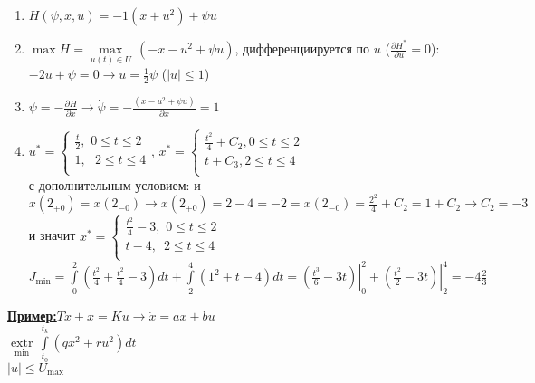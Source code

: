 \documentclass[preprint,russian,a5paper,10pt,twoside,mediummath]{ncc}
\newcommand{\ExampleMy}{\textbf{\underline{Пример:}}}
\begin{document}
\begin{enumerate}
\item $H\left( \psi ,x,u \right)=-1\left( x+{{u}^{2}} \right)+\psi u$
\item $\max H=\underset{u\left( t \right)\in U}{\mathop{\max }}\,\left( -x-{{u}^{2}}+\psi u \right)$, дифференциируется по $u$ ($\frac{\partial {{H}^{*}}}{\partial u}=0$):$-2u+\psi =0\to u=\frac{1}{2}\psi $ ($\left| u \right|\le 1$)
\item $\psi =-\frac{\partial H}{\partial x}\to \dot{\psi }=-\frac{\left( x-{{u}^{2}}+\psi u \right)}{\partial x}=1$
\item ${{u}^{*}}=\left\{ \begin{array}{*{35}{l}}
   \frac{t}{2},\,\,0\le t\le 2  \\
   1,\,\,\,\,2\le t\le 4  \\
\end{array} \right.$, ${{x}^{*}}=\left\{ \begin{array}{*{35}{l}}
   \frac{{{t}^{2}}}{4}+{{C}_{2}},0\le t\le 2  \\
   t+{{C}_{3}},2\le t\le 4  \\
\end{array} \right.$
\\с дополнительным условием: 
и $x\left( {{2}_{+0}} \right)=x\left( {{2}_{-0}} \right)\to x\left( {{2}_{+0}} \right)=2-4=-2=x\left( {{2}_{-0}} \right)=\frac{{{2}^{2}}}{4}+{{C}_{2}}=1+{{C}_{2}}\to {{C}_{2}}=-3$ и значит ${{x}^{*}}=\left\{ \begin{array}{*{35}{l}}
   \frac{{{t}^{2}}}{4}-3,\,\,0\le t\le 2  \\
   t-4,\,\,\,2\le t\le 4  \\
\end{array} \right.$
\\${{J}_{\min }}=\int\limits_{0}^{2}{\left( \frac{{{t}^{2}}}{4}+\frac{{{t}^{2}}}{4}-3 \right)}dt+\int\limits_{2}^{4}{\left( {{1}^{2}}+t-4 \right)}dt=\left. \left( \frac{{{t}^{3}}}{6}-3t \right) \right|_{0}^{2}+\left. \left( \frac{{{t}^{2}}}{2}-3t \right) \right|_{2}^{4}=-4\frac{2}{3}$ 
\end{enumerate}
\ExampleMy $T\dot{x}+x=Ku\to \dot{x}=ax+bu$ 
\\$\underset{\min }{\mathop{extr}}\,\int\limits_{{{t}_{0}}}^{{{t}_{k}}}{\left( q{{x}^{2}}+r{{u}^{2}} \right)}dt$
\\$\left| u \right|\le {{U}_{\max }}$
\end{document}

